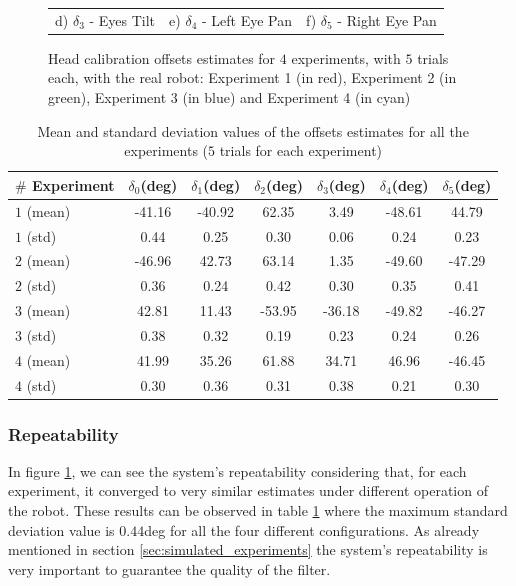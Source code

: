 \begin{figure}
\begin{tabular}{ccc}
 d) $\delta_3$ - Eyes Tilt & e) $\delta_4$ - Left Eye Pan & f) $\delta_5$ - Right Eye Pan
\end{tabular}
\caption{Head calibration offsets estimates for $4$ experiments, with $5$ trials each, with the real robot: Experiment 1 (in red), Experiment 2 (in green), Experiment 3 (in blue) and Experiment 4 (in cyan)}
\label{fig:real_head_offsets_convergence}
\end{figure}

\begin{table}
\centering
\begin{tabular}{lcccccc}
 \hline
 $\#$ Experiment & $\delta_0$(deg) & $\delta_1$(deg) & $\delta_2$(deg) & $\delta_3$(deg) & $\delta_4$(deg) & $\delta_5$(deg) \\
 \hline
$1$ (mean) & -41.16 & -40.92 & 62.35 & 3.49 & -48.61 & 44.79 \\
$1$ (std) & 0.44 & 0.25 & 0.30 & 0.06 & 0.24 & 0.23 \\
\hline
$2$ (mean) & -46.96 & 42.73 & 63.14 & 1.35 & -49.60 & -47.29 \\
$2$ (std) & 0.36 & 0.24 & 0.42 & 0.30 & 0.35 & 0.41 \\
\hline
$3$ (mean) & 42.81 & 11.43 & -53.95 & -36.18 & -49.82 & -46.27 \\
$3$ (std) & 0.38 & 0.32 & 0.19 & 0.23 & 0.24 & 0.26 \\
\hline
$4$ (mean) & 41.99 & 35.26 & 61.88 & 34.71 & 46.96 & -46.45 \\
$4$ (std) & 0.30 & 0.36 & 0.31 & 0.38 & 0.21 & 0.30 \\
 \hline
\end{tabular}
\caption{Mean and standard deviation values of the offsets estimates for all the experiments ($5$ trials for each experiment)}
\label{tab:real_head_offsets_convergence}
\end{table}

\subsubsection{Repeatability}

In figure \ref{fig:real_head_offsets_convergence}, we can see the system's repeatability considering that, for each experiment, it converged to very similar estimates under different operation of the robot. These results can be observed in table \ref{tab:real_head_offsets_convergence} where the maximum standard deviation value is $0.44$deg for all the four different configurations. As already mentioned in section \ref{sec:simulated_experiments} the system's repeatability is very important to guarantee the quality of the filter. 

